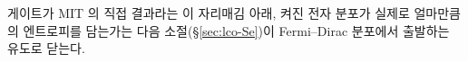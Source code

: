 게이트가 MIT 의 직접 결과라는 이 자리매김 아래, 켜진 전자 분포가 실제로 얼마만큼의 엔트로피를 담는가는
다음 소절(\S\ref{sec:lco-Se})이 Fermi--Dirac 분포에서 출발하는 유도로 닫는다.
